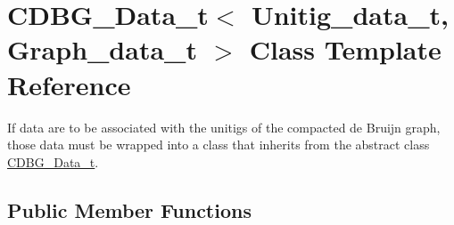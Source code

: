\hypertarget{classCDBG__Data__t}{}\section{C\+D\+B\+G\+\_\+\+Data\+\_\+t$<$ Unitig\+\_\+data\+\_\+t, Graph\+\_\+data\+\_\+t $>$ Class Template Reference}
\label{classCDBG__Data__t}


If data are to be associated with the unitigs of the compacted de Bruijn graph, those data must be wrapped into a class that inherits from the abstract class \hyperlink{classCDBG__Data__t}{C\+D\+B\+G\+\_\+\+Data\+\_\+t}.  


\subsection*{Public Member Functions}
